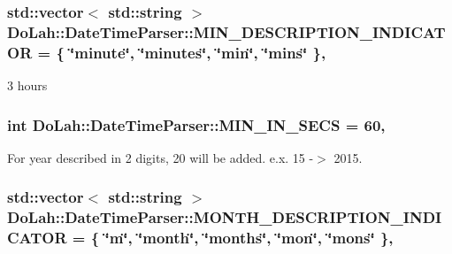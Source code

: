 \subsubsection[{M\+I\+N\+\_\+\+D\+E\+S\+C\+R\+I\+P\+T\+I\+O\+N\+\_\+\+I\+N\+D\+I\+C\+A\+T\+O\+R}]{\setlength{\rightskip}{0pt plus 5cm}std\+::vector$<$ std\+::string $>$ Do\+Lah\+::\+Date\+Time\+Parser\+::\+M\+I\+N\+\_\+\+D\+E\+S\+C\+R\+I\+P\+T\+I\+O\+N\+\_\+\+I\+N\+D\+I\+C\+A\+T\+O\+R = \{ \char`\"{}minute\char`\"{}, \char`\"{}minutes\char`\"{}, \char`\"{}min\char`\"{}, \char`\"{}mins\char`\"{} \}\hspace{0.3cm}{\ttfamily [static]}, {\ttfamily [private]}}\label{class_do_lah_1_1_date_time_parser_af9a3cc6e4d648744d460b5475cadccee}


3 hours 

\hypertarget{class_do_lah_1_1_date_time_parser_a6bcbe9c2772910a92e518a39f4ca81b7}{}
\subsubsection[{M\+I\+N\+\_\+\+I\+N\+\_\+\+S\+E\+C\+S}]{\setlength{\rightskip}{0pt plus 5cm}int Do\+Lah\+::\+Date\+Time\+Parser\+::\+M\+I\+N\+\_\+\+I\+N\+\_\+\+S\+E\+C\+S = 60\hspace{0.3cm}{\ttfamily [static]}, {\ttfamily [private]}}\label{class_do_lah_1_1_date_time_parser_a6bcbe9c2772910a92e518a39f4ca81b7}


For year described in 2 digits, 20 will be added. e.\+x. 15 -\/$>$ 2015. 

\hypertarget{class_do_lah_1_1_date_time_parser_a9e5d75c4251b0035d4debcc8ff6ce713}{}
\subsubsection[{M\+O\+N\+T\+H\+\_\+\+D\+E\+S\+C\+R\+I\+P\+T\+I\+O\+N\+\_\+\+I\+N\+D\+I\+C\+A\+T\+O\+R}]{\setlength{\rightskip}{0pt plus 5cm}std\+::vector$<$ std\+::string $>$ Do\+Lah\+::\+Date\+Time\+Parser\+::\+M\+O\+N\+T\+H\+\_\+\+D\+E\+S\+C\+R\+I\+P\+T\+I\+O\+N\+\_\+\+I\+N\+D\+I\+C\+A\+T\+O\+R = \{ \char`\"{}m\char`\"{}, \char`\"{}month\char`\"{}, \char`\"{}months\char`\"{}, \char`\"{}mon\char`\"{}, \char`\"{}mons\char`\"{} \}\hspace{0.3cm}{\ttfamily [static]}, {\ttfamily [private]}}\label{class_do_lah_1_1_date_time_parser_a9e5d75c4251b0035d4debcc8ff6ce713}


